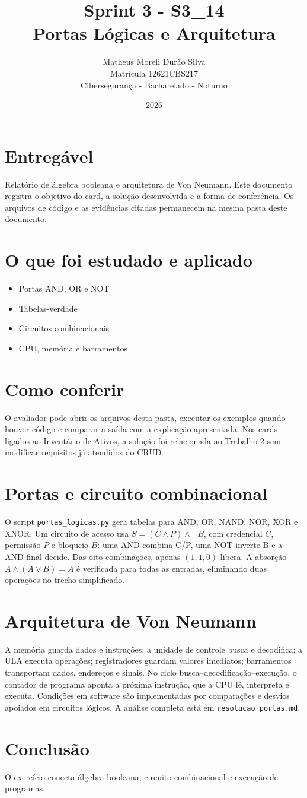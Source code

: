 \documentclass[12pt]{article}
\title{Sprint 3 - S3\_14\\Portas Lógicas e Arquitetura}
\author{Matheus Moreli Durão Silva\\Matrícula 12621CBS217\\Cibersegurança - Bacharelado - Noturno}
\date{2026}
\begin{document}
\maketitle

\section*{Entregável}
Relatório de álgebra booleana e arquitetura de Von Neumann. Este documento registra o objetivo do card, a solução desenvolvida e a forma de conferência. Os arquivos de código e as evidências citadas permanecem na mesma pasta deste documento.

\section*{O que foi estudado e aplicado}
\begin{itemize}
\item Portas AND, OR e NOT
\item Tabelas-verdade
\item Circuitos combinacionais
\item CPU, memória e barramentos
\end{itemize}

\section*{Como conferir}
O avaliador pode abrir os arquivos desta pasta, executar os exemplos quando houver código e comparar a saída com a explicação apresentada. Nos cards ligados ao Inventário de Ativos, a solução foi relacionada ao Trabalho 2 sem modificar requisitos já atendidos do CRUD.

\section*{Portas e circuito combinacional}
O script \texttt{portas\_logicas.py} gera tabelas para AND, OR, NAND, NOR, XOR e XNOR. Um circuito de acesso usa $S=(C\land P)\land\neg B$, com credencial $C$, permissão $P$ e bloqueio $B$: uma AND combina C/P, uma NOT inverte B e a AND final decide. Das oito combinações, apenas $(1,1,0)$ libera. A absorção $A\land(A\lor B)=A$ é verificada para todas as entradas, eliminando duas operações no trecho simplificado.
\section*{Arquitetura de Von Neumann}
A memória guarda dados e instruções; a unidade de controle busca e decodifica; a ULA executa operações; registradores guardam valores imediatos; barramentos transportam dados, endereços e sinais. No ciclo busca--decodificação--execução, o contador de programa aponta a próxima instrução, que a CPU lê, interpreta e executa. Condições em software são implementadas por comparações e desvios apoiados em circuitos lógicos. A análise completa está em \texttt{resolucao\_portas.md}.
\section*{Conclusão}
O exercício conecta álgebra booleana, circuito combinacional e execução de programas.
\end{document}

